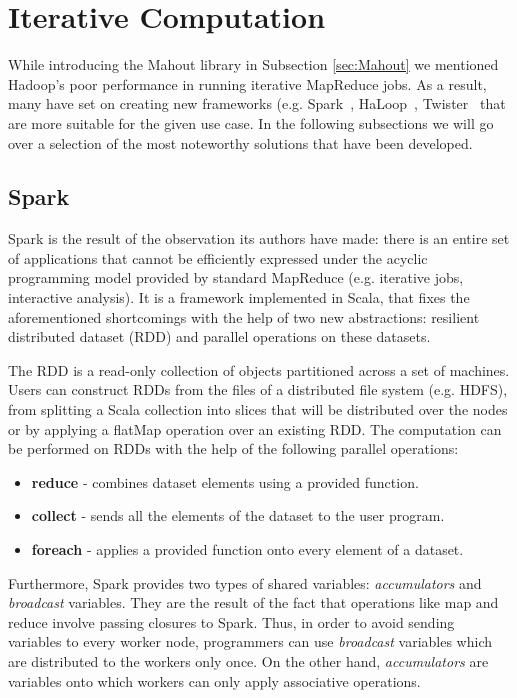 \documentclass[11pt,a4paper,twoside]{report}
\begin{document}
\section{Iterative Computation}
\label{sec:IterativeMapReduce}
While introducing the Mahout library in Subsection \ref{sec:Mahout} we mentioned Hadoop's poor performance in running iterative MapReduce jobs. As a result, many have set on creating new frameworks (e.g. Spark~\cite{Spark,Spark2}, HaLoop~\cite{HaLoop}, Twister~\cite{Twister} that are more suitable for the given use case. In the following subsections we will go over a selection of the most noteworthy solutions that have been developed.

\subsection{Spark}
Spark is the result of the observation its authors have made: there is an entire set of applications that cannot be efficiently expressed under the acyclic programming model provided by standard MapReduce (e.g. iterative jobs, interactive analysis). It is a framework implemented in Scala, that fixes the aforementioned shortcomings with the help of two new abstractions: resilient distributed dataset (RDD) and parallel operations on these datasets.


The RDD is a read-only collection of objects partitioned across a set of machines. Users can construct RDDs from the files of a distributed file system (e.g. HDFS), from splitting a Scala collection into slices that will be distributed over the nodes or by applying a flatMap operation over an existing RDD. The computation can be performed on RDDs with the help of the following parallel operations:

\begin{itemize}
\item{}
\textbf{reduce} - combines dataset elements using a provided function.
\item{}
\textbf{collect} - sends all the elements of the dataset to the user program.
\item{}
\textbf{foreach} - applies a provided function onto every element of a dataset.
\end{itemize}


Furthermore, Spark provides two types of shared variables: \textit{accumulators} and \textit{broadcast} variables. They are the result of the fact that operations like map and reduce involve passing closures to Spark. Thus, in order to avoid sending variables to every worker node, programmers can use \textit{broadcast} variables which are distributed to the workers only once. On the other hand, \textit{accumulators} are variables onto which workers can only apply associative operations.
\end{document}
